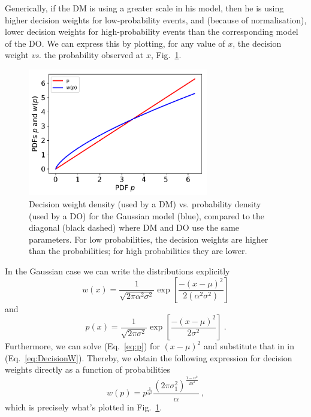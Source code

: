 \documentclass[a4paper, 12pt]{article}
\newcommand{\elabel}[1]{\label{eq:#1}}
\newcommand{\eref}[1]{(Eq.~\ref{eq:#1})}
\newcommand{\flabel}[1]{\label{fig:#1}}
\newcommand{\fref}[1]{Fig.~\ref{fig:#1}}
\newcommand{\be}{\begin{equation}}
\newcommand{\ee}{\end{equation}}
\newcommand{\ND}{\mathcal{N}} %
\begin{document}
%
%

Generically, if the DM is using a greater scale in his model, then he is using higher decision weights for low-probability events, and (because of normalisation), lower decision weights for high-probability events than the corresponding model of the DO. We can express this by plotting, for any value of $x$, the decision weight {\it vs.} the probability observed at $x$, \fref{probability_weights}.

\begin{figure}[htb]
\centering
\includegraphics[width=0.7\textwidth]{./figs/decision_weights.pdf}
\caption{Decision weight density (used by a DM) vs. probability density (used by a DO) for the Gaussian model (blue), compared to the diagonal (black dashed) where DM and DO use the same parameters. For low probabilities, the decision weights are higher than the probabilities; for high probabilities they are lower.}
\flabel{probability_weights}
\end{figure}

In the Gaussian case we can write the distributions explicitly
\be \elabel{DecisionW}
	w(x)=\frac{1}{\sqrt{2\pi \alpha^2 \sigma^2}}\exp\left[\frac{-(x -\mu )^2}{2 (\alpha^2 \sigma^2)}\right]
\ee
and
\be
	p(x)=\frac{1}{\sqrt{2\pi \sigma^2}}\exp\left[\frac{-(x -\mu )^2}{2 \sigma^2}\right] ~.
\elabel{p}
\ee
% 
Furthermore, we can solve \eref{p} for $(x -\mu)^2$ and substitute that in in \eref{DecisionW}. Thereby, we obtain the following expression for decision weights directly as a function of probabilities
\be
w(p)= p^{\frac{1}{\alpha^2}} \frac{\left(2\pi\sigma_1^2\right)^{\frac{1-\alpha^2}{2\alpha^2}}}{\alpha} ~,
\elabel{w_of_p}
\ee
which is precisely what's plotted in \fref{probability_weights}. 
\end{document}
